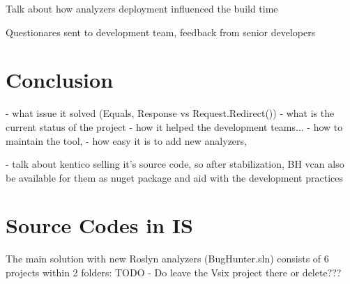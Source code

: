 \documentclass[
  digital, %
  table,   %
  lof,     %
  lot,     %
  oneside,
]{fithesis3}
\begin{document}
Talk about how analyzers deployment influenced the build time

Questionares sent to development team, feedback from senior developers

\chapter{Conclusion}
  - what issue it solved (Equals, Response vs Request.Redirect())
  - what is the current status of the project
  - how it helped the development teams...
  - how to maintain the tool, 
  - how easy it is to add new analyzers, 

- talk about kentico selling it's source code, so after stabilization, BH vcan also be available for them as nuget package and aid with the development practices 

	\makeatletter\thesis@blocks@clear\makeatother

	\printindex
    
  \printbibliography

	\appendix %
  \chapter{Source Codes in IS}
  The main solution with new Roslyn analyzers (BugHunter.sln) consists of 6 projects within 2 folders: TODO - Do leave the Vsix project there or delete???
\end{document}
